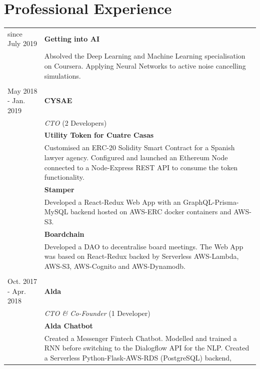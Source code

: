 \documentclass[11pt]{article}
\begin{document}
\section*{Professional Experience}
\begin{tabularx}{\textwidth}{lX}
  since July 2019        & \textbf{Getting into AI} \\
                         & Absolved the Deep Learning and Machine Learning
                           specialisation on Coursera. Applying Neural Networks to active noise
                           cancelling simulations.  \\\\
  May 2018 - Jan. 2019   & \textbf{CYSAE} \\
                         & \textit{CTO} (2 Developers) \\[2mm]
                         & \textbf{Utility Token for Cuatre Casas} \\
                         & Customised an ERC-20 Solidity Smart Contract for
                           a Spanish lawyer agency. Configured and launched an
                           Ethereum Node connected to a Node-Express REST API to consume
                           the token functionality. \\[1.5mm]
                         & \textbf{Stamper} \\
                         & Developed a React-Redux Web App with an
                           GraphQL-Prisma-MySQL backend hosted on AWS-ERC docker
                           containers and AWS-S3. \\[1.5mm]
                         & \textbf{Boardchain} \\
                         & Developed a DAO to decentralise board meetings. The
                           Web App was based on React-Redux backed by
                           Serverless AWS-Lambda, AWS-S3, AWS-Cognito and AWS-Dynamodb. \\\\
  Oct. 2017 - Apr. 2018  & \textbf{Alda} \\
                         & \textit{CTO \& Co-Founder} (1 Developer) \\[2mm]
                         & \textbf{Alda Chatbot} \\
                         & Created a Messenger Fintech Chatbot. Modelled and
                           trained a RNN before switching to the Dialogflow API
                           for the NLP. Created a Serverless Python-Flask-AWS-RDS (PostgreSQL) backend,

\end{tabularx}
\end{document}
